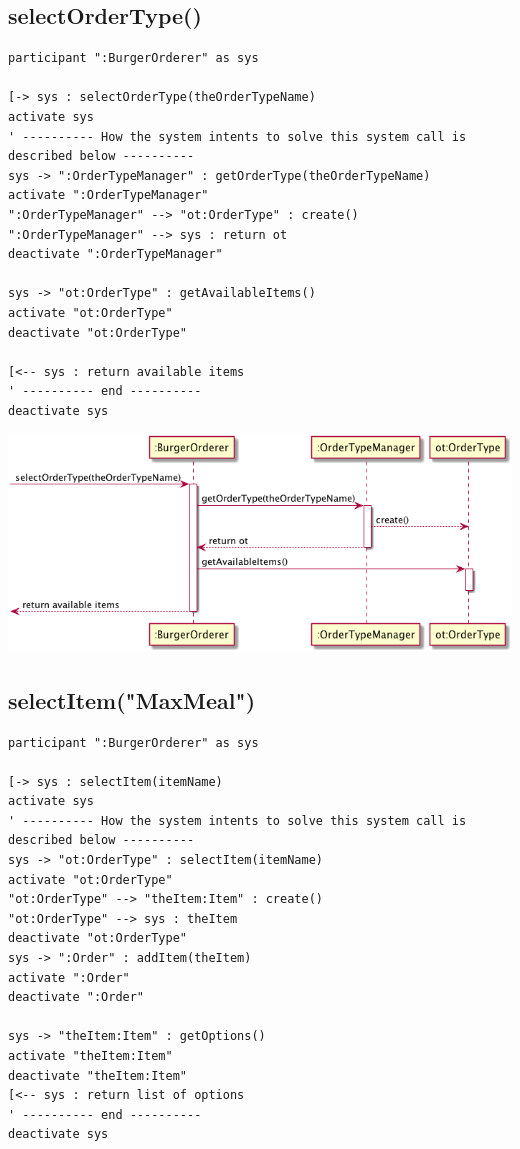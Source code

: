\documentclass[11pt]{article}
\begin{document}
\subsection{selectOrderType()}
\label{sec:orgfc5da88}
\begin{verbatim}
participant ":BurgerOrderer" as sys

[-> sys : selectOrderType(theOrderTypeName)
activate sys
' ---------- How the system intents to solve this system call is described below ----------
sys -> ":OrderTypeManager" : getOrderType(theOrderTypeName)
activate ":OrderTypeManager"
":OrderTypeManager" --> "ot:OrderType" : create()
":OrderTypeManager" --> sys : return ot
deactivate ":OrderTypeManager"

sys -> "ot:OrderType" : getAvailableItems()
activate "ot:OrderType"
deactivate "ot:OrderType"

[<-- sys : return available items
' ---------- end ----------
deactivate sys
\end{verbatim}

\begin{center}
\includegraphics[width=.9\linewidth]{202004-bo-selectOT.png}
\end{center}

\subsection{selectItem("MaxMeal")}
\label{sec:org95024bb}
\begin{verbatim}
participant ":BurgerOrderer" as sys

[-> sys : selectItem(itemName)
activate sys
' ---------- How the system intents to solve this system call is described below ----------
sys -> "ot:OrderType" : selectItem(itemName)
activate "ot:OrderType"
"ot:OrderType" --> "theItem:Item" : create()
"ot:OrderType" --> sys : theItem
deactivate "ot:OrderType"
sys -> ":Order" : addItem(theItem)
activate ":Order"
deactivate ":Order"

sys -> "theItem:Item" : getOptions()
activate "theItem:Item"
deactivate "theItem:Item"
[<-- sys : return list of options
' ---------- end ----------
deactivate sys
\end{verbatim}
\end{document}
